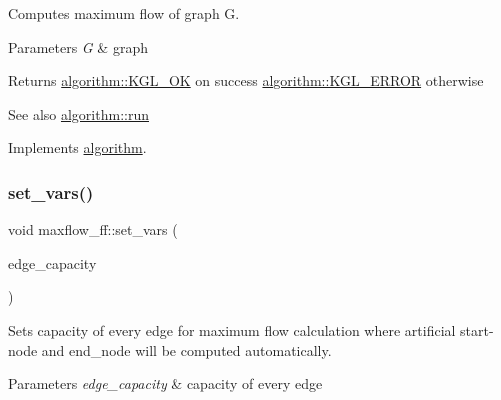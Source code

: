 Computes maximum flow of graph {\ttfamily G}.


\begin{DoxyParams}{Parameters}
{\em G} & graph \\
\hline
\end{DoxyParams}
\begin{DoxyReturn}{Returns}
{\ttfamily \mbox{\hyperlink{classalgorithm_af1a0078e153aa99c24f9bdf0d97f6710aae4c1cd7fe8d8cf4b143241a6e7c31cf}{algorithm\+::\+K\+G\+L\+\_\+\+OK}}} on success {\ttfamily \mbox{\hyperlink{classalgorithm_af1a0078e153aa99c24f9bdf0d97f6710ae67bf27b2ef31f73e545a7f9f4a69556}{algorithm\+::\+K\+G\+L\+\_\+\+E\+R\+R\+OR}}} otherwise 
\end{DoxyReturn}
\begin{DoxySeeAlso}{See also}
\mbox{\hyperlink{classalgorithm_a734b189509a8d6b56b65f8ff772d43ca}{algorithm\+::run}} 
\end{DoxySeeAlso}


Implements \mbox{\hyperlink{classalgorithm_a734b189509a8d6b56b65f8ff772d43ca}{algorithm}}.

\mbox{\label{classmaxflow__ff_ad2485a4c093dbcfa045d1e6e5d78f533}} 
\subsubsection{\texorpdfstring{set\+\_\+vars()}{set\_vars()}\hspace{0.1cm}{\footnotesize\ttfamily [1/2]}}
{\footnotesize\ttfamily void maxflow\+\_\+ff\+::set\+\_\+vars (\begin{DoxyParamCaption}\item[{const \mbox{\hyperlink{classedge__map}{edge\+\_\+map}}$<$ double $>$ \&}]{edge\+\_\+capacity }\end{DoxyParamCaption})}

Sets capacity of every edge for maximum flow calculation where artificial start-\/node and end\+\_\+node will be computed automatically.


\begin{DoxyParams}{Parameters}
{\em edge\+\_\+capacity} & capacity of every edge \\
\hline
\end{DoxyParams}
\mbox{\label{classmaxflow__ff_a1e715030d70080e0c9ecf118dd81e8f6}} 
